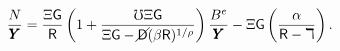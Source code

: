 \begin{equation}
\frac{N}{\pmb{Y}}= \frac{\Xi \mathsf{G}}{\mathsf{R}} \left( 1 + \frac{\mho \Xi \mathsf{G}}{\Xi \mathsf{G} -\cancel{\mathsf{D}}(\beta \mathsf{R} )^{1/\rho}} \right) \frac{B^{e}}{\pmb{Y}} -\Xi \mathsf{G}\left( \frac{\alpha}{\mathsf{R}-\daleth}\right).
\label{eq:NFARat}
\end{equation}
